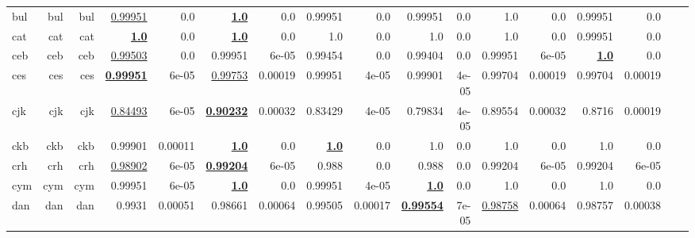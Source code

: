 \documentclass[11pt]{article}
\begin{document}
\begin{table*}[h]
{\begin{tabular}{lrrrrrrrrrrrrrrrr}
bul         & bul         & bul         & \underline{0.99951}         & 0.0         & \textbf{\underline{1.0}}         & 0.0         & 0.99951         & 0.0         & 0.99951         & 0.0         & 1.0         & 0.0         & 0.99951         & 0.0         \\
cat         & cat         & cat         & \textbf{\underline{1.0}}         & 0.0         & \textbf{\underline{1.0}}         & 0.0         & 1.0         & 0.0         & 1.0         & 0.0         & 1.0         & 0.0         & 0.99951         & 0.0         \\
ceb         & ceb         & ceb         & \underline{0.99503}         & 0.0         & 0.99951         & 6e-05         & 0.99454         & 0.0         & 0.99404         & 0.0         & 0.99951         & 6e-05         & \textbf{\underline{1.0}}         & 0.0         \\
ces         & ces         & ces         & \textbf{\underline{0.99951}}         & 6e-05         & \underline{0.99753}         & 0.00019         & 0.99951         & 4e-05         & 0.99901         & 4e-05         & 0.99704         & 0.00019         & 0.99704         & 0.00019         \\
cjk         & cjk         & cjk         & \underline{0.84493}         & 6e-05         & \textbf{\underline{0.90232}}         & 0.00032         & 0.83429         & 4e-05         & 0.79834         & 4e-05         & 0.89554         & 0.00032         & 0.8716         & 0.00019         \\
ckb         & ckb         & ckb         & 0.99901         & 0.00011         & \textbf{\underline{1.0}}         & 0.0         & \textbf{\underline{1.0}}         & 0.0         & 1.0         & 0.0         & 1.0         & 0.0         & 1.0         & 0.0         \\
crh         & crh         & crh         & \underline{0.98902}         & 6e-05         & \textbf{\underline{0.99204}}         & 6e-05         & 0.988         & 0.0         & 0.988         & 0.0         & 0.99204         & 6e-05         & 0.99204         & 6e-05         \\
cym         & cym         & cym         & 0.99951         & 6e-05         & \textbf{\underline{1.0}}         & 0.0         & 0.99951         & 4e-05         & \textbf{\underline{1.0}}         & 0.0         & 1.0         & 0.0         & 1.0         & 0.0         \\
dan         & dan         & dan         & 0.9931         & 0.00051         & 0.98661         & 0.00064         & 0.99505         & 0.00017         & \textbf{\underline{0.99554}}         & 7e-05         & \underline{0.98758}         & 0.00064         & 0.98757         & 0.00038         \\

\end{tabular}}
\end{table*}
\end{document}
